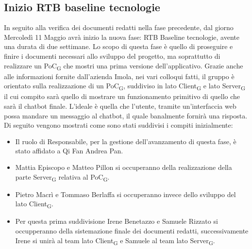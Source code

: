 \subsection{Inizio RTB baseline tecnologie}
In seguito alla verifica dei documenti redatti nella fase precedente, dal giorno Mercoledì 11 Maggio avrà inizio la nuova fase: RTB Baseline tecnologie, avente una durata di due settimane. 
Lo scopo di questa fase è quello di proseguire e finire i documenti necessari allo sviluppo del progetto, ma soprattutto di realizzare un PoC\textsubscript{G} che mostri una prima versione dell'applicativo. Grazie anche alle informazioni fornite dall'azienda Imola, nei vari colloqui fatti, il gruppo è orientato sulla realizzazione di un PoC\textsubscript{G}, suddiviso in lato Client\textsubscript{G} e lato Server\textsubscript{G} il cui compito sarà quello di mostrare un funzionamento primitivo di quello che sarà il chatbot finale. L'ideale è quella che l'utente, tramite un'interfaccia web possa mandare un messaggio al chatbot, il quale banalmente fornirà una risposta. 
Di seguito vengono mostrati come sono stati suddivisi i compiti inizialmente: 
\begin{itemize}
    \item Il ruolo di Responsabile, per la gestione dell'avanzamento di questa fase, è stato affidato a Qi Fan Andrea Pan.
    \item Mattia Episcopo e Matteo Pillon si occuperanno della realizzazione della parte Server\textsubscript{G} relativa al PoC\textsubscript{G}.
    \item Pietro Macrì e Tommaso Berlaffa si occuperanno invece dello sviluppo del lato Client\textsubscript{G}.
    \item Per questa prima suddivisione Irene Benetazzo e Samuele Rizzato si occupperanno della sistemazione finale dei documenti redatti, successivamente Irene si unirà al team lato Client\textsubscript{G} e Samuele al team lato Server\textsubscript{G}. 
\end{itemize}
\newpage
